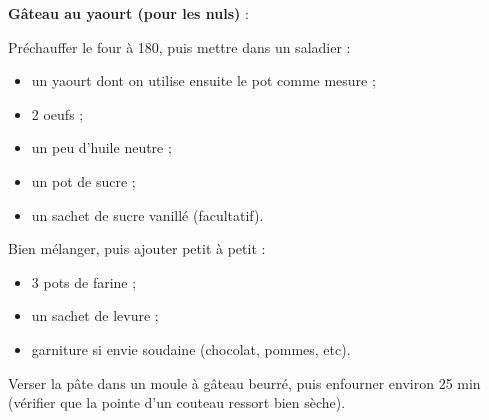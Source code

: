 \documentclass[a4paper]{article}
\begin{document}
{\bf Gâteau au yaourt (pour les nuls)} :

\vspace{10mm}

Préchauffer le four à 180, puis mettre dans un saladier :

\vspace{2mm}

\begin{itemize}[label= \Large,font=\color{magenta},parsep=0cm,itemsep=0cm]
        \item un yaourt dont on utilise ensuite le pot comme mesure ;
        \item 2 oeufs ;
        \item un peu d'huile neutre ;
        \item un pot de sucre ;
        \item un sachet de sucre vanillé (facultatif).
\end{itemize}

\vspace{2mm}

Bien mélanger, puis ajouter petit à petit :

\vspace{2mm}

\begin{itemize}[label= \Large,font=\color{magenta},parsep=0cm,itemsep=0cm]
        \item 3 pots de farine ;
        \item un sachet de levure ;
        \item garniture si envie soudaine (chocolat, pommes, etc).
   \end{itemize} 

\vspace{2mm}

Verser la pâte dans un moule à gâteau beurré, puis enfourner environ 25 min (vérifier que la pointe d'un couteau ressort bien sèche).
\end{document}
